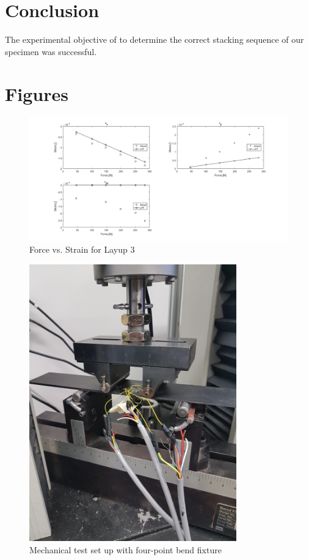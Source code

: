 \documentclass[12pt]{article}
\begin{document}
\section{Conclusion} %
The experimental objective of to determine the correct stacking sequence of our specimen was  successful.

\section{Figures}
\begin{figure}[H]
	\centering
	\includegraphics[width=1\textwidth]{FvsStrain.png}
	\caption{Force vs. Strain for Layup 3}
	\label{fig:FvStrain}
\end{figure}
\begin{figure}[H]
\centering
\includegraphics[width=0.8\textwidth]{fixture4pt.jpg}
\caption{Mechanical test set up with four-point bend fixture}
\label{fig:Fixture}
\end{figure}
\end{document}

